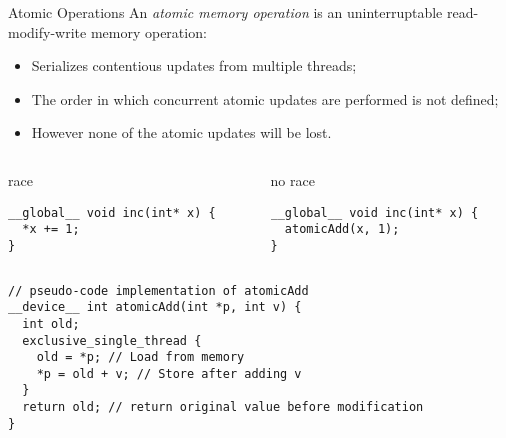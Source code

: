 \documentclass[aspectratio=43]{beamer}
\begin{document}
\begin{frame}[fragile]{Atomic Operations}
    An \emph{atomic memory operation} is an uninterruptable read-modify-write memory operation:
    \begin{itemize}
        \item Serializes contentious updates from multiple threads;
        \item The order in which concurrent atomic updates are performed is not defined;
        \item However none of the atomic updates will be lost.
    \end{itemize}
    \vspace{-0.3cm}
    \begin{columns}[T]
        \begin{column}{0.48\textwidth}
            \begin{code}{race}
                \begin{lstlisting}[style=boxcudatiny]
__global__ void inc(int* x) {
  *x += 1;
}
                 \end{lstlisting}
            \end{code}
        \end{column}

        \begin{column}{0.48\textwidth}
            \begin{code}{no race}
                \begin{lstlisting}[style=boxcudatiny]
__global__ void inc(int* x) {
  atomicAdd(x, 1);
}
                \end{lstlisting}
            \end{code}
        \end{column}
    \end{columns}

    \begin{code}{}
        \begin{lstlisting}[style=boxcudatiny]
// pseudo-code implementation of atomicAdd
__device__ int atomicAdd(int *p, int v) {
  int old;
  exclusive_single_thread {
    old = *p; // Load from memory
    *p = old + v; // Store after adding v
  }
  return old; // return original value before modification
}
        \end{lstlisting}
    \end{code}

\end{frame}
\end{document}
